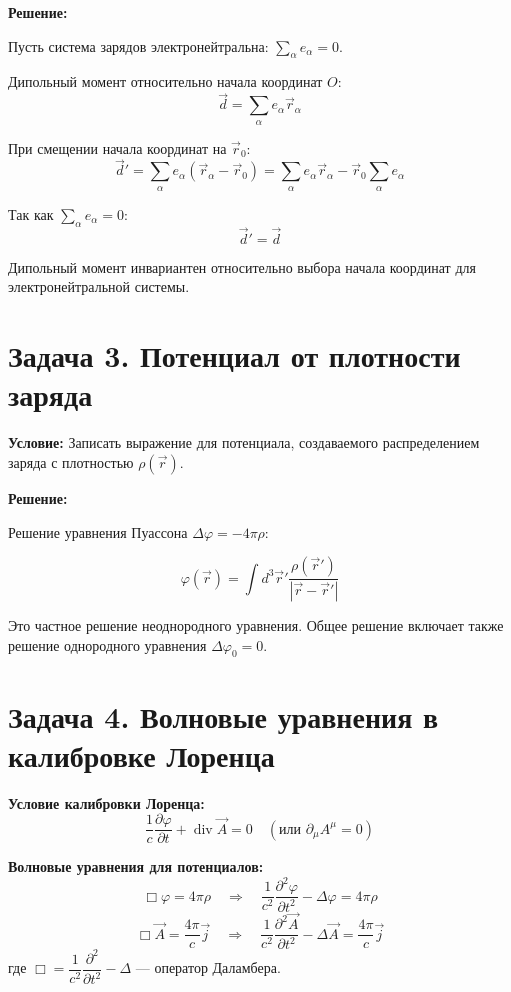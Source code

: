 \documentclass[12pt,a4paper]{article}
\begin{document}
\textbf{Решение:}

Пусть система зарядов электронейтральна: $\sum_\alpha e_\alpha = 0$.

Дипольный момент относительно начала координат $O$:
\begin{equation}
\boxed{\vec{d} = \sum_\alpha e_\alpha \vec{r}_\alpha}
\end{equation}

При смещении начала координат на $\vec{r}_0$:
\begin{equation}
\boxed{\vec{d}' = \sum_\alpha e_\alpha (\vec{r}_\alpha - \vec{r}_0) = \sum_\alpha e_\alpha \vec{r}_\alpha - \vec{r}_0 \sum_\alpha e_\alpha}
\end{equation}

Так как $\sum_\alpha e_\alpha = 0$:
\begin{equation}
\boxed{\vec{d}' = \vec{d}}
\end{equation}

Дипольный момент инвариантен относительно выбора начала координат для электронейтральной системы.

\section*{Задача 3. Потенциал от плотности заряда}

\textbf{Условие:} Записать выражение для потенциала, создаваемого распределением заряда с плотностью $\rho(\vec{r})$.

\textbf{Решение:}

Решение уравнения Пуассона $\Delta \varphi = -4\pi \rho$:

\begin{equation}
\boxed{\varphi(\vec{r}) = \int d^3\vec{r}' \frac{\rho(\vec{r}')}{|\vec{r} - \vec{r}'|}}
\end{equation}

Это частное решение неоднородного уравнения. Общее решение включает также решение однородного уравнения $\Delta \varphi_0 = 0$.

\section*{Задача 4. Волновые уравнения в калибровке Лоренца}

\textbf{Условие калибровки Лоренца:}
\[
\frac{1}{c}\frac{\partial \varphi}{\partial t} + \operatorname{div}\vec{A} = 0 \quad \left(\text{или } \boxed{\partial_\mu A^\mu = 0}\right)
\]

\textbf{Волновые уравнения для потенциалов:}
\[
\Box \varphi = 4\pi\rho \quad \Longrightarrow \quad \boxed{\frac{1}{c^2}\frac{\partial^2 \varphi}{\partial t^2} - \Delta \varphi = 4\pi\rho}
\]
\[
\Box \vec{A} = \frac{4\pi}{c}\vec{j} \quad \Longrightarrow \quad \boxed{\frac{1}{c^2}\frac{\partial^2 \vec{A}}{\partial t^2} - \Delta \vec{A} = \frac{4\pi}{c}\vec{j}}
\]
где $\Box = \dfrac{1}{c^2}\dfrac{\partial^2}{\partial t^2} - \Delta$ --- оператор Даламбера.
\end{document}
